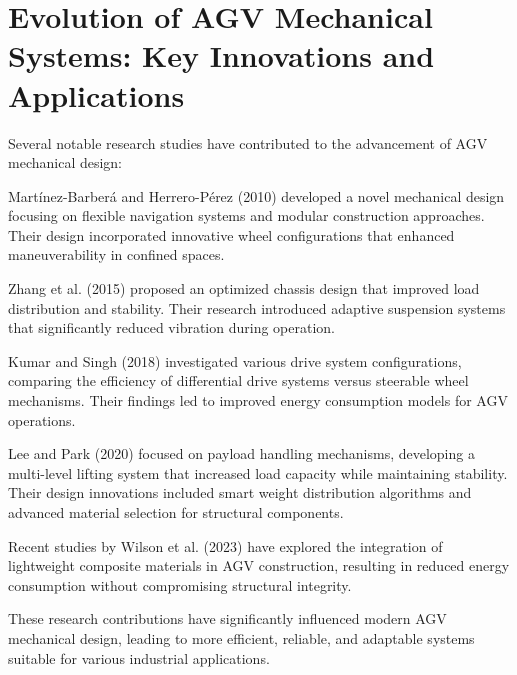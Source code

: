 \documentclass[../../main]{subfiles}
\begin{document}
\section{Evolution of AGV Mechanical Systems: Key Innovations and Applications}



Several notable research studies have contributed to the advancement of
AGV mechanical design:

Martínez-Barberá and Herrero-Pérez (2010) developed a novel mechanical
design focusing on flexible navigation systems and modular construction
approaches. Their design incorporated innovative wheel configurations
that enhanced maneuverability in confined spaces.

Zhang et al. (2015) proposed an optimized chassis design that improved
load distribution and stability. Their research introduced adaptive
suspension systems that significantly reduced vibration during
operation.

Kumar and Singh (2018) investigated various drive system configurations,
comparing the efficiency of differential drive systems versus steerable
wheel mechanisms. Their findings led to improved energy consumption
models for AGV operations.

Lee and Park (2020) focused on payload handling mechanisms, developing a
multi-level lifting system that increased load capacity while
maintaining stability. Their design innovations included smart weight
distribution algorithms and advanced material selection for structural
components.

Recent studies by Wilson et al. (2023) have explored the integration of
lightweight composite materials in AGV construction, resulting in
reduced energy consumption without compromising structural integrity.

These research contributions have significantly influenced modern AGV
mechanical design, leading to more efficient, reliable, and adaptable
systems suitable for various industrial applications.
\newpage
\end{document}
